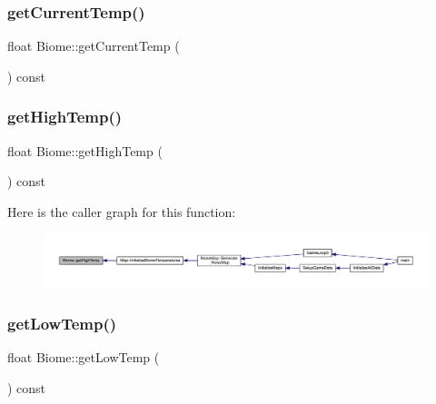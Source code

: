 \mbox{\label{class_biome_a39f59fbedcc41210860860aa56fae295}} 
\subsubsection{\texorpdfstring{get\+Current\+Temp()}{getCurrentTemp()}}
{\footnotesize\ttfamily float Biome\+::get\+Current\+Temp (\begin{DoxyParamCaption}{ }\end{DoxyParamCaption}) const}

\mbox{\label{class_biome_aee5574622d28c0bb3b91eece705252c4}} 
\subsubsection{\texorpdfstring{get\+High\+Temp()}{getHighTemp()}}
{\footnotesize\ttfamily float Biome\+::get\+High\+Temp (\begin{DoxyParamCaption}{ }\end{DoxyParamCaption}) const}

Here is the caller graph for this function\+:
\nopagebreak
\begin{figure}[H]
\begin{center}
\leavevmode
\includegraphics[width=350pt]{d6/dd0/class_biome_aee5574622d28c0bb3b91eece705252c4_icgraph}
\end{center}
\end{figure}
\mbox{\label{class_biome_afd3fa2df745d92eb95aaf8b58d119ca5}} 
\subsubsection{\texorpdfstring{get\+Low\+Temp()}{getLowTemp()}}
{\footnotesize\ttfamily float Biome\+::get\+Low\+Temp (\begin{DoxyParamCaption}{ }\end{DoxyParamCaption}) const}

